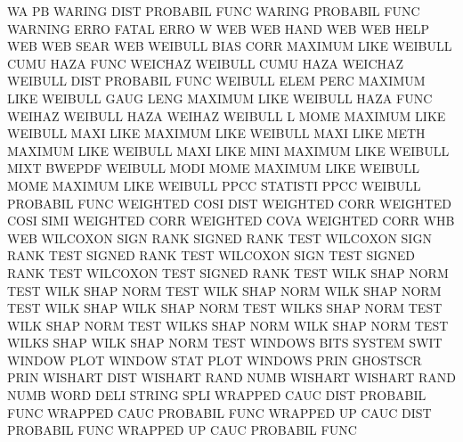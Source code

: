 WA                                      PB
WARING   DIST                           PROBABIL FUNC
WARING                                  PROBABIL FUNC
WARNING  ERRO                           FATAL    ERRO
W                                       WEB
WEB      HAND                           WEB
WEB      HELP                           WEB
WEB      SEAR                           WEB
WEIBULL  BIAS CORR                      MAXIMUM  LIKE
WEIBULL  CUMU HAZA FUNC                 WEICHAZ
WEIBULL  CUMU HAZA                      WEICHAZ
WEIBULL  DIST                           PROBABIL FUNC
WEIBULL  ELEM PERC                      MAXIMUM  LIKE
WEIBULL  GAUG LENG                      MAXIMUM  LIKE
WEIBULL  HAZA FUNC                      WEIHAZ
WEIBULL  HAZA                           WEIHAZ
WEIBULL  L    MOME                      MAXIMUM  LIKE
WEIBULL  MAXI LIKE                      MAXIMUM  LIKE
WEIBULL  MAXI LIKE METH                 MAXIMUM  LIKE
WEIBULL  MAXI LIKE MINI                 MAXIMUM  LIKE
WEIBULL  MIXT                           BWEPDF
WEIBULL  MODI MOME                      MAXIMUM  LIKE
WEIBULL  MOME                           MAXIMUM  LIKE
WEIBULL  PPCC                           STATISTI PPCC
WEIBULL                                 PROBABIL FUNC
WEIGHTED COSI DIST                      WEIGHTED CORR
WEIGHTED COSI SIMI                      WEIGHTED CORR
WEIGHTED COVA                           WEIGHTED CORR
WHB                                     WEB
WILCOXON SIGN RANK                      SIGNED   RANK TEST
WILCOXON SIGN RANK TEST                 SIGNED   RANK TEST
WILCOXON SIGN TEST                      SIGNED   RANK TEST
WILCOXON TEST                           SIGNED   RANK TEST
WILK     SHAP NORM TEST                 WILK     SHAP NORM TEST
WILK     SHAP NORM                      WILK     SHAP NORM TEST
WILK     SHAP                           WILK     SHAP NORM TEST
WILKS    SHAP NORM TEST                 WILK     SHAP NORM TEST
WILKS    SHAP NORM                      WILK     SHAP NORM TEST
WILKS    SHAP                           WILK     SHAP NORM TEST
WINDOWS  BITS                           SYSTEM   SWIT
WINDOW   PLOT                           WINDOW   STAT PLOT
WINDOWS  PRIN                           GHOSTSCR PRIN
WISHART  DIST                           WISHART  RAND NUMB
WISHART                                 WISHART  RAND NUMB
WORD     DELI                           STRING   SPLI
WRAPPED  CAUC DIST                      PROBABIL FUNC
WRAPPED  CAUC                           PROBABIL FUNC
WRAPPED  UP   CAUC DIST                 PROBABIL FUNC
WRAPPED  UP   CAUC                      PROBABIL FUNC
